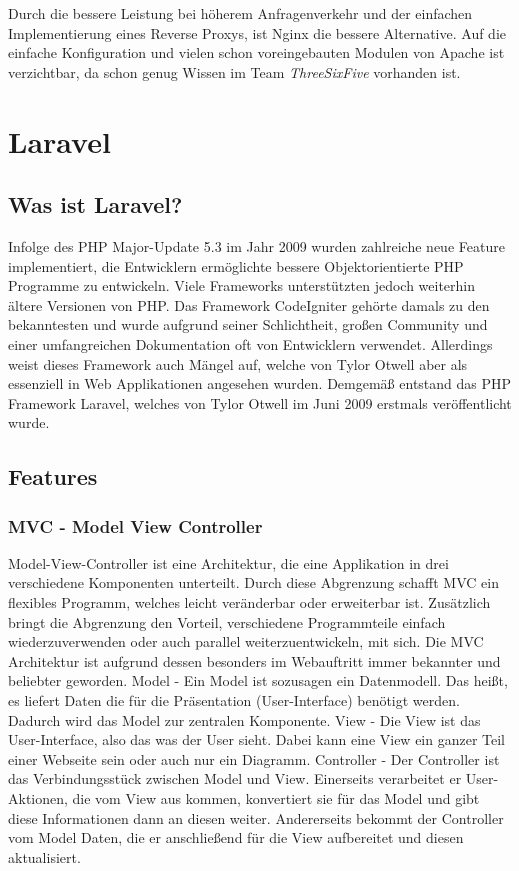 Durch die bessere Leistung bei höherem Anfragenverkehr und der einfachen Implementierung eines Reverse Proxys, ist Nginx die bessere Alternative. Auf die einfache Konfiguration und vielen schon voreingebauten Modulen von Apache ist verzichtbar, da schon genug Wissen im Team \textit{ThreeSixFive} vorhanden ist.

\section{Laravel}

\subsection{Was ist Laravel?}

Infolge des PHP Major-Update 5.3 im Jahr 2009 wurden zahlreiche neue Feature implementiert, die Entwicklern ermöglichte bessere Objektorientierte PHP Programme zu entwickeln. Viele Frameworks unterstützten jedoch weiterhin ältere Versionen von PHP. Das Framework CodeIgniter gehörte damals zu den bekanntesten und wurde aufgrund seiner Schlichtheit, großen Community und einer umfangreichen Dokumentation oft von Entwicklern verwendet. Allerdings weist dieses Framework auch Mängel auf, welche von Tylor Otwell aber als essenziell in Web Applikationen angesehen wurden. Demgemäß entstand das PHP Framework Laravel\cite{Laravel}, welches von Tylor Otwell im Juni 2009 erstmals veröffentlicht wurde.

\subsection{Features}

\subsubsection{MVC - Model View Controller}

Model-View-Controller\cite{MVC} ist eine Architektur, die eine Applikation in drei verschiedene Komponenten unterteilt. Durch diese Abgrenzung schafft MVC ein flexibles Programm, welches leicht veränderbar oder erweiterbar ist. Zusätzlich bringt die Abgrenzung den Vorteil, verschiedene Programmteile einfach wiederzuverwenden oder auch parallel weiterzuentwickeln, mit sich. Die MVC Architektur ist aufgrund dessen besonders im Webauftritt immer bekannter und beliebter geworden.
Model - Ein Model ist sozusagen ein Datenmodell. Das heißt, es liefert Daten die für die Präsentation (User-Interface) benötigt werden. Dadurch wird das Model zur zentralen Komponente. 
View - Die View ist das User-Interface, also das was der User sieht. Dabei kann eine View ein ganzer Teil einer Webseite sein oder auch nur ein Diagramm. 
Controller - Der Controller ist das Verbindungsstück zwischen Model und View. Einerseits verarbeitet er User-Aktionen, die vom View aus kommen, konvertiert sie für das Model und gibt diese Informationen dann an diesen weiter. Andererseits bekommt der Controller vom Model Daten, die er anschließend für die View aufbereitet und diesen aktualisiert.

